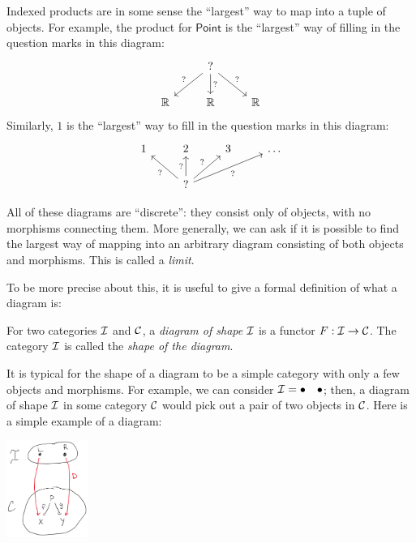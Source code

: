 Indexed products are in some sense the ``largest'' way to map
into a tuple of objects.
For example, the product for \(\mathsf{Point}\)
is the ``largest'' way of filling in the question marks in this diagram:
\[%
\begin{tikzcd}
   & ? \arrow[ld, "?"'] \arrow[d, "?"] \arrow[rd, "?"] &    \\
\R & \R                                                & \R
\end{tikzcd}\]
Similarly, \(1\) is the ``largest'' way to fill in
the question marks in this diagram:
\[%
\begin{tikzcd}
1 & 2                                                                  & 3 & \dots \\
  & ? \arrow[lu, "?"] \arrow[u, "?"] \arrow[ru, "?"] \arrow[rru, "?"'] &   &
\end{tikzcd}\]

All of these diagrams are ``discrete'': they consist only of objects,
with no morphisms connecting them.
More generally, we can ask if it is possible to find the largest
way of mapping into an arbitrary diagram consisting of both objects and morphisms.
This is called a \emph{limit}.

To be more precise about this, it is useful to give a formal definition of 
what a diagram is:
\begin{definition}[Diagram]
  \sloppy
  For two categories $\mathcal I$ and $\mathcal C$, a
  \emph{diagram of shape $\mathcal I$} is a functor $F : \mathcal I \to \mathcal C$.
  The category $\mathcal I$ is called the \emph{shape of the diagram}.
\end{definition}

It is typical for the shape of a diagram to be a simple category with
only a few objects and morphisms.  For example, we can consider $\mathcal I = \bullet
\quad \bullet$; then, a diagram of shape $\mathcal I$ in some category $\mathcal C$ would
pick out a pair of two objects in $\mathcal C$. Here is a simple example of a
diagram:

\begin{center}
  \includegraphics[width=100px]{fig/diagram-1.png}
\end{center}

